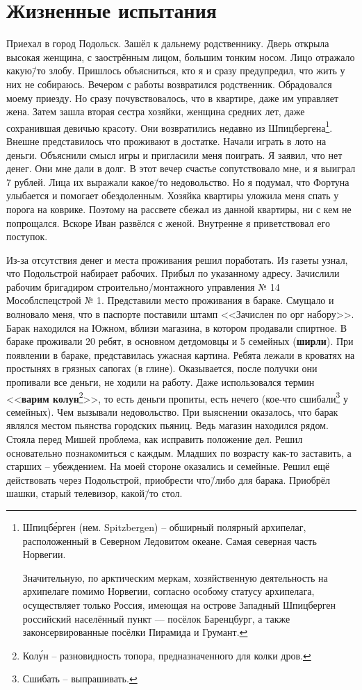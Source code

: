 ﻿\chapter{Жизненные испытания}

Приехал в город Подольск. Зашёл к дальнему родственнику. Дверь открыла высокая женщина, с заострённым лицом, большим тонким носом. Лицо отражало какую\=/то злобу. Пришлось объясниться, кто я и сразу предупредил, что жить у них не собираюсь. Вечером с работы возвратился родственник. Обрадовался моему приезду. Но сразу почувствовалось, что в квартире, даже им управляет жена. Затем зашла вторая сестра хозяйки, женщина средних лет, даже сохранившая девичью красоту. Они возвратились недавно из Шпицбергена\footnote{Шпицб\'{е}рген (нем. Spitzbergen) \--- обширный полярный архипелаг, расположенный в Северном Ледовитом океане. Самая северная часть Норвегии. 

Значительную, по арктическим меркам, хозяйственную деятельность на архипелаге помимо Норвегии, согласно особому статусу архипелага, осуществляет только Россия, имеющая на острове Западный Шпицберген российский населённый пункт — посёлок Баренцбург, а также законсервированные посёлки Пирамида и Грумант.}. 
Внешне представилось что проживают в достатке. Начали играть в лото на деньги. Объяснили смысл игры и пригласили меня поиграть. Я заявил, что нет денег. Они мне дали в долг. В этот вечер счастье сопутствовало мне, и я выиграл 7 рублей. Лица их выражали какое\=/то недовольство. Но я подумал, что Фортуна улыбается и помогает обездоленным. Хозяйка квартиры уложила меня спать у порога на коврике. Поэтому на рассвете сбежал из данной квартиры, ни с кем не попрощался. Вскоре Иван развёлся с женой. Внутренне я приветствовал его поступок.

Из-за отсутствия денег и места проживания решил поработать. Из газеты узнал, что Подольстрой набирает рабочих. Прибыл по указанному адресу. Зачислили рабочим бригадиром строительно\-/монтажного управления № 14 Мособлспецстрой № 1. Представили место проживания в бараке. Смущало и волновало меня, что в паспорте поставили штамп <<Зачислен по орг набору>>. Барак находился на Южном, вблизи магазина, в котором продавали спиртное. В бараке проживали 20 ребят, в основном детдомовцы и 5 семейных (\textbf{ширли}). При появлении в бараке, представилась ужасная картина. Ребята лежали в кроватях на простынях в грязных сапогах (в глине). Оказывается, после получки они пропивали все деньги, не ходили на работу. Даже использовался термин <<\textbf{варим колун}\footnote{Кол\'{у}н \--- разновидность топора, предназначенного для колки дров.}>>, то есть деньги пропиты, есть нечего (кое-что сшибали\footnote{Сшибать \--- выпрашивать.} у семейных). Чем вызывали недовольство. При выяснении оказалось, что барак являлся местом пьянства городских пьяниц. Ведь магазин находился рядом. Стояла перед Мишей проблема, как исправить положение дел. Решил основательно познакомиться с каждым. Младших по возрасту как-то заставить, а старших \--- убеждением. На моей стороне оказались и семейные. Решил ещё действовать через Подольстрой, приобрести что\=/либо для барака. Приобрёл шашки, старый телевизор, какой\=/то стол.

